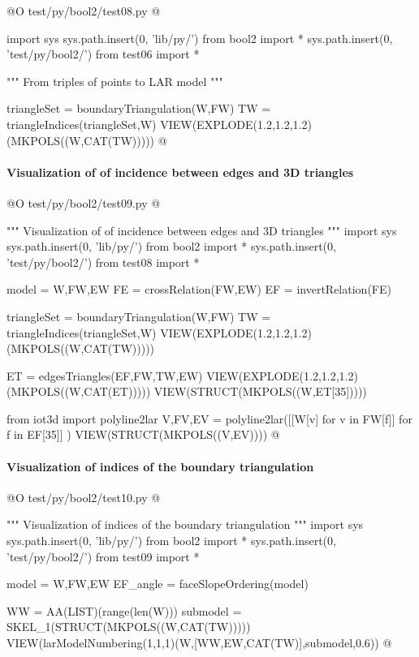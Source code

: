 \documentclass[11pt,oneside]{article}    %
\begin{document}
@O test/py/bool2/test08.py @{
import sys
sys.path.insert(0, 'lib/py/')
from bool2 import *
sys.path.insert(0, 'test/py/bool2/')
from test06 import *

""" From triples of points to LAR model """

triangleSet = boundaryTriangulation(W,FW)
TW = triangleIndices(triangleSet,W)
VIEW(EXPLODE(1.2,1.2,1.2)(MKPOLS((W,CAT(TW)))))
@}



\paragraph{Visualization of of incidence between edges and 3D triangles}

@O test/py/bool2/test09.py @{
""" Visualization of of incidence between edges and 3D triangles """
import sys
sys.path.insert(0, 'lib/py/')
from bool2 import *
sys.path.insert(0, 'test/py/bool2/')
from test08 import *

model = W,FW,EW
FE = crossRelation(FW,EW)
EF = invertRelation(FE)

triangleSet = boundaryTriangulation(W,FW)
TW = triangleIndices(triangleSet,W)
VIEW(EXPLODE(1.2,1.2,1.2)(MKPOLS((W,CAT(TW)))))

ET = edgesTriangles(EF,FW,TW,EW)
VIEW(EXPLODE(1.2,1.2,1.2)(MKPOLS((W,CAT(ET)))))
VIEW(STRUCT(MKPOLS((W,ET[35]))))

from iot3d import polyline2lar
V,FV,EV = polyline2lar([[W[v] for v in FW[f]] for f in EF[35]] )
VIEW(STRUCT(MKPOLS((V,EV))))
@}



\paragraph{Visualization of indices of the boundary triangulation}

@O test/py/bool2/test10.py @{
""" Visualization of indices of the boundary triangulation """
import sys
sys.path.insert(0, 'lib/py/')
from bool2 import *
sys.path.insert(0, 'test/py/bool2/')
from test09 import *

model = W,FW,EW
EF_angle = faceSlopeOrdering(model)

WW = AA(LIST)(range(len(W)))
submodel = SKEL_1(STRUCT(MKPOLS((W,CAT(TW)))))
VIEW(larModelNumbering(1,1,1)(W,[WW,EW,CAT(TW)],submodel,0.6))
@}
\end{document}
